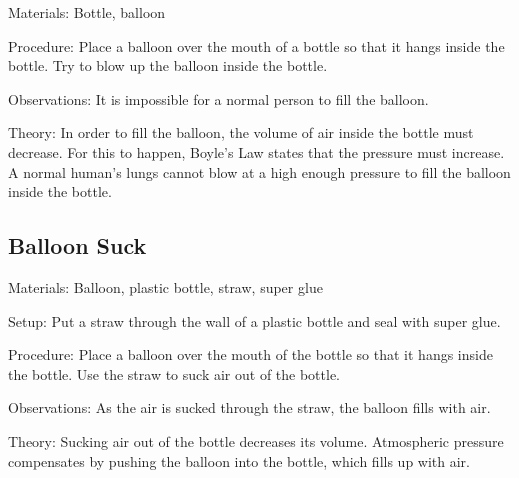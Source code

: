 \begin{multicols}{2}

\begin{description*}
\item[Materials:]{Bottle, balloon}
\item[Procedure:]{Place a balloon over the mouth of a bottle so that it hangs inside the bottle. Try to blow up the balloon inside the bottle.}
\item[Observations:]{It is impossible for a normal person to fill the balloon.}
\item[Theory:]{In order to fill the balloon, the volume of air inside the bottle must decrease. For this to happen, Boyle's Law states that the pressure must increase. A normal human's lungs cannot blow at a high enough pressure to fill the balloon inside the bottle.}
\end{description*}

\subsection{Balloon Suck}


\begin{description*}
\item[Materials:]{Balloon, plastic bottle, straw, super glue}
\item[Setup:]{Put a straw through the wall of a plastic bottle and seal with super glue.}
\item[Procedure:]{Place a balloon over the mouth of the bottle so that it hangs inside the bottle. Use the straw to suck air out of the bottle.}
\item[Observations:]{As the air is sucked through the straw, the balloon fills with air.}
\item[Theory:]{Sucking air out of the bottle decreases its volume. Atmospheric pressure compensates by pushing the balloon into the bottle, which fills up with air.}
\end{description*}



\end{multicols}

\pagebreak
